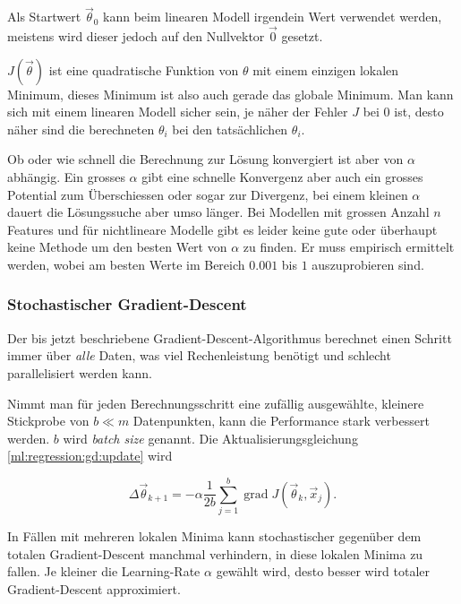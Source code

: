 Als Startwert $\vec\theta_0$ kann beim linearen Modell irgendein Wert verwendet werden, meistens wird dieser jedoch
auf den Nullvektor $\vec 0$ gesetzt.

$J(\vec \theta)$ ist eine quadratische Funktion von $\theta$ mit einem einzigen lokalen
Minimum, %
dieses Minimum ist also auch gerade das globale Minimum. Man kann sich mit einem linearen
Modell sicher sein, je näher der Fehler $J$ bei $0$ ist, desto näher sind die berechneten
$\theta_i$ bei den tatsächlichen $\theta_i$.

Ob oder wie schnell die Berechnung zur Lösung konvergiert ist aber von $\alpha$ abhängig.
Ein grosses $\alpha$ gibt eine schnelle Konvergenz aber auch ein grosses Potential zum
Überschiessen oder sogar zur Divergenz, bei einem kleinen $\alpha$ dauert die Lösungssuche
aber umso länger. Bei Modellen mit grossen Anzahl $n$ Features und für nichtlineare
Modelle gibt es leider keine gute oder überhaupt keine Methode um den besten Wert von
$\alpha$ zu finden. Er muss empirisch ermittelt werden, wobei am besten Werte im Bereich
$0.001$ bis $1$ auszuprobieren sind. \cite[S. 51]{ml:introduction-to-ml}

\subsubsection{Stochastischer Gradient-Descent}

Der bis jetzt beschriebene Gradient-Descent-Algorithmus berechnet einen Schritt immer über
\emph{alle} Daten, was viel Rechenleistung benötigt und schlecht parallelisiert werden
kann.

Nimmt man für jeden Berechnungsschritt eine zufällig ausgewählte, kleinere Stickprobe von
$b \ll m$ Datenpunkten, kann die Performance stark verbessert werden. $b$ wird
\emph{batch size} genannt. Die Aktualisierungsgleichung \eqref{ml:regression:gd:update} wird

\begin{equation}
  \Delta \vec\theta_{k+1} = - \alpha \frac{1}{2b} \sum_{j=1}^{b} \operatorname{grad} J(\vec
  \theta_k, \vec x_j).
\end{equation}

In Fällen mit mehreren lokalen Minima kann stochastischer gegenüber dem totalen Gradient-Descent manchmal
verhindern, in diese lokalen Minima zu fallen. Je kleiner die Learning-Rate $\alpha$ gewählt
wird, desto besser wird totaler Gradient-Descent approximiert. 
\cite[S. 93ff]{ml:ml-tom-mitchell}

